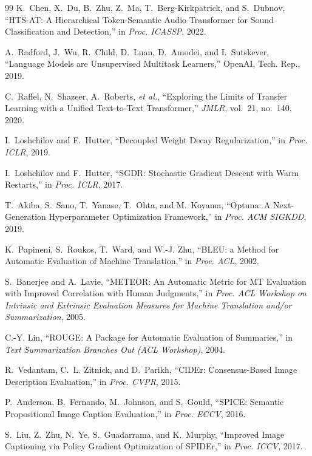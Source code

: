 \documentclass[conference]{IEEEtran}
\begin{document}
\begin{thebibliography}{99}
K.~Chen, X.~Du, B.~Zhu, Z.~Ma, T.~Berg-Kirkpatrick, and S.~Dubnov,
``HTS-AT: A Hierarchical Token-Semantic Audio Transformer for Sound Classification and
Detection,'' in \emph{Proc. ICASSP}, 2022.

A.~Radford, J.~Wu, R.~Child, D.~Luan, D.~Amodei, and I.~Sutskever,
``Language Models are Unsupervised Multitask Learners,'' OpenAI, Tech. Rep., 2019.

C.~Raffel, N.~Shazeer, A.~Roberts, \emph{et al.},
``Exploring the Limits of Transfer Learning with a Unified Text-to-Text Transformer,''
\emph{JMLR}, vol.~21, no.~140, 2020.

I.~Loshchilov and F.~Hutter,
``Decoupled Weight Decay Regularization,'' in \emph{Proc. ICLR}, 2019.

I.~Loshchilov and F.~Hutter,
``SGDR: Stochastic Gradient Descent with Warm Restarts,'' in \emph{Proc. ICLR}, 2017.

T.~Akiba, S.~Sano, T.~Yanase, T.~Ohta, and M.~Koyama,
``Optuna: A Next-Generation Hyperparameter Optimization Framework,'' in \emph{Proc. ACM SIGKDD},
2019.

K.~Papineni, S.~Roukos, T.~Ward, and W.-J. Zhu,
``BLEU: a Method for Automatic Evaluation of Machine Translation,'' in \emph{Proc. ACL}, 2002.

S.~Banerjee and A.~Lavie,
``METEOR: An Automatic Metric for MT Evaluation with Improved Correlation with Human
Judgments,'' in \emph{Proc. ACL Workshop on Intrinsic and Extrinsic Evaluation Measures for
Machine Translation and/or Summarization}, 2005.

C.-Y. Lin,
``ROUGE: A Package for Automatic Evaluation of Summaries,'' in \emph{Text Summarization
Branches Out (ACL Workshop)}, 2004.

R.~Vedantam, C.~L. Zitnick, and D.~Parikh,
``CIDEr: Consensus-Based Image Description Evaluation,'' in \emph{Proc. CVPR}, 2015.

P.~Anderson, B.~Fernando, M.~Johnson, and S.~Gould,
``SPICE: Semantic Propositional Image Caption Evaluation,'' in \emph{Proc. ECCV}, 2016.

S.~Liu, Z.~Zhu, N.~Ye, S.~Guadarrama, and K.~Murphy,
``Improved Image Captioning via Policy Gradient Optimization of SPIDEr,'' in \emph{Proc. ICCV},
2017.


\end{thebibliography}
\end{document}
